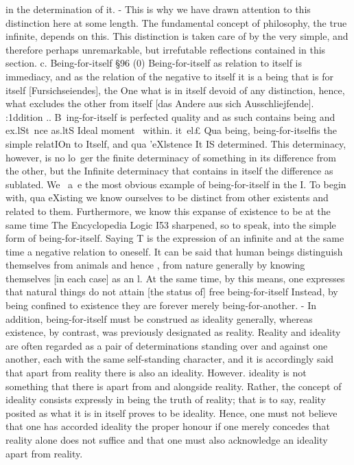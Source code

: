 in the determination of it. - This is why we have drawn attention
to this distinction here at some length. The fundamental concept
of philosophy, the true infinite, depends on this. This distinction
is taken care of by the very simple, and therefore perhaps
unremarkable, but irrefutable reflections contained in this
section.
c. Being-for-itself
§96
(0) Being-for-itself as relation to itself is immediacy, and as the relation
of the negative to itself it is a being that is for itself [Fursichseiendes], the
One what is in itself devoid of any distinction, hence, what excludes the
other from itself [das Andere aus sich Ausschliejfende].
:1ddition .. B~ing-for-itself is perfected quality and as such contains being and
ex.lSt~nce as.ltS Ideal moment~ within. it~el£ Qua being, being-for-itselfis the simple
relatIOn to Itself, and qua 'eXlstence It IS determined. This determinacy, however,
is no lo~ger the finite determinacy of something in its difference from the other,
but the Infinite determinacy that contains in itself the difference as sublated.
We ~a~e the most obvious example of being-for-itself in the I. To begin with,
qua eXisting we know ourselves to be distinct from other existents and related to
them. Furthermore, we know this expanse of existence to be at the same time
The Encyclopedia Logic
I53
sharpened, so to speak, into the simple form of being-for-itself. Saying T is the
expression of an infinite and at the same time a negative relation to oneself. It
can be said that human beings distinguish themselves from animals and hence
, from nature generally by knowing themselves [in each case] as an l. At the same
time, by this means, one expresses that natural things do not attain [the status
of] free being-for-itself Instead, by being confined to existence they are forever
merely being-for-another. - In addition, being-for-itself must be construed as
ideality generally, whereas existence, by contrast, was previously designated as
reality. Reality and ideality are often regarded as a pair of determinations standing
over and against one another, each with the same self-standing character, and it is
accordingly said that apart from reality there is also an ideality. However. ideality is
not something that there is apart from and alongside reality. Rather, the concept of
ideality consists expressly in being the truth of reality; that is to say, reality posited
as what it is in itself proves to be ideality. Hence, one must not believe that one
has accorded ideality the proper honour if one merely concedes that reality alone
does not suffice and that one must also acknowledge an ideality apart from reality.
